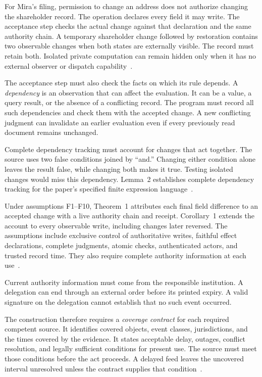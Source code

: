 \documentclass{momentum}
\begin{document}
For Mira's filing, permission to change an address does not authorize changing the shareholder record.
The operation declares every field it may write.
The acceptance step checks the actual change against that declaration and the same authority chain.
A temporary shareholder change followed by restoration contains two observable changes when both states are externally visible.
The record must retain both.
Isolated private computation can remain hidden only when it has no external observer or dispatch capability~\cite[Section~3.3 and Section~4, Corollary~1]{institutions}.

The acceptance step must also check the facts on which its rule depends.
A \emph{dependency} is an observation that can affect the evaluation.
It can be a value, a query result, or the absence of a conflicting record.
The program must record all such dependencies and check them with the accepted change.
A new conflicting judgment can invalidate an earlier evaluation even if every previously read document remains unchanged.

Complete dependency tracking must account for changes that act together.
The source uses two false conditions joined by ``and.''
Changing either condition alone leaves the result false, while changing both makes it true.
Testing isolated changes would miss this dependency.
Lemma~2 establishes complete dependency tracking for the paper's specified finite expression language~\cite[Section~3.2]{institutions}.

Under assumptions F1--F10, Theorem~1 attributes each final field difference to an accepted change with a live authority chain and receipt.
Corollary~1 extends the account to every observable write, including changes later reversed.
The assumptions include exclusive control of authoritative writes, faithful effect declarations, complete judgments, atomic checks, authenticated actors, and trusted record time.
They also require complete authority information at each use~\cite[Section~4]{institutions}.

Current authority information must come from the responsible institution.
A delegation can end through an external order before its printed expiry.
A valid signature on the delegation cannot establish that no such event occurred.

The construction therefore requires a \emph{coverage contract} for each required competent source.
It identifies covered objects, event classes, jurisdictions, and the times covered by the evidence.
It states acceptable delay, outages, conflict resolution, and legally sufficient conditions for present use.
The source must meet those conditions before the act proceeds.
A delayed feed leaves the uncovered interval unresolved unless the contract supplies that condition~\cite[Section~6.1]{institutions}.
\end{document}
